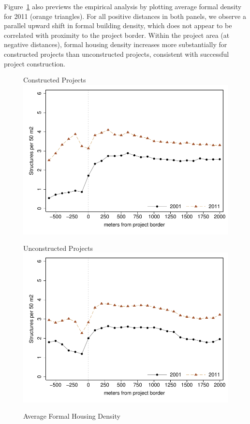 \documentclass[12pt]{article}
\begin{document}
Figure~\ref{figure:formalmeans} also previews the empirical analysis by plotting average formal density for 2011 (orange triangles).  For all positive distances in both panels, we observe a parallel upward shift in formal building density, which does not appear to be correlated with proximity to the project border.  Within the project area (at negative distances), formal housing density increases more substantially for constructed projects than unconstructed projects, consistent with successful project construction.

\begin{figure}
\caption{Average Formal Housing Density}\label{figure:formalmeans}
\centering
\begin{minipage}[b]{.4\textwidth}
\centering
\hspace{1cm}Constructed Projects
\includegraphics[scale=.5]{figures/bblu_for_rdp_admin.pdf}
\end{minipage}
\begin{minipage}[b]{.4\textwidth}
\centering
\hspace{1cm}Unconstructed Projects
\includegraphics[scale=.5]{figures/bblu_for_placebo_admin.pdf}
\end{minipage}
\end{figure}
\end{document}
